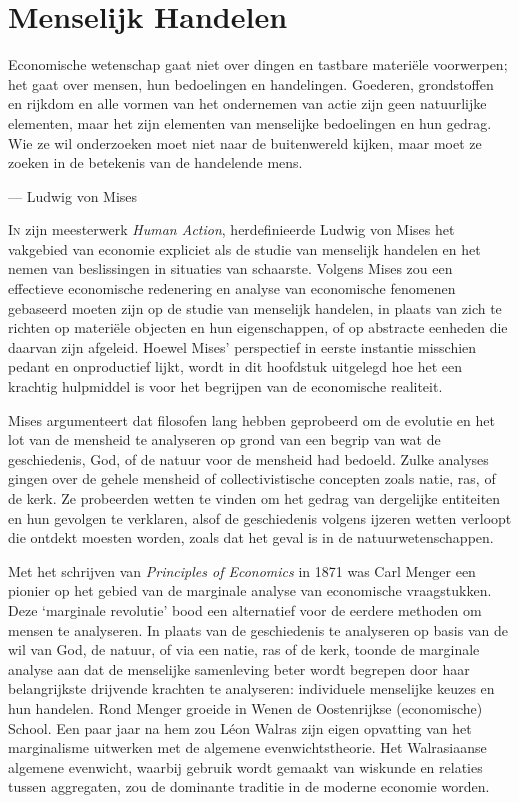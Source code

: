 \chapter{Menselijk Handelen}

\begin{blockquotebox}
    Economische wetenschap gaat niet over dingen en tastbare materiële voorwerpen; het gaat over mensen, hun bedoelingen en handelingen. Goederen, grondstoffen en rijkdom en alle vormen van het ondernemen van actie zijn geen natuurlijke elementen, maar het zijn elementen van menselijke bedoelingen en hun gedrag. Wie ze wil onderzoeken moet niet naar de buitenwereld kijken, maar moet ze zoeken in de betekenis van de handelende mens.\footnotemark \par\raggedleft--- Ludwig von Mises
\end{blockquotebox}

\noindent \lettrine{I}n zijn meesterwerk \textit{Human Action}, herdefinieerde Ludwig von Mises het vakgebied van economie expliciet als de studie van menselijk handelen en het nemen van beslissingen in situaties van schaarste. Volgens Mises zou een effectieve economische redenering en analyse van economische fenomenen gebaseerd moeten zijn op de studie van menselijk handelen, in plaats van zich te richten op materiële objecten en hun eigenschappen, of op abstracte eenheden die daarvan zijn afgeleid. Hoewel Mises' perspectief in eerste instantie misschien pedant en onproductief lijkt, wordt in dit hoofdstuk uitgelegd hoe het een krachtig hulpmiddel is voor het begrijpen van de economische realiteit.

Mises argumenteert dat filosofen lang hebben geprobeerd om de evolutie en het lot van de mensheid te analyseren op grond van een begrip van wat de geschiedenis, God, of de natuur voor de mensheid had bedoeld. Zulke analyses gingen over de gehele mensheid of collectivistische concepten zoals natie, ras, of de kerk. Ze probeerden wetten te vinden om het gedrag van dergelijke entiteiten en hun gevolgen te verklaren, alsof de geschiedenis volgens ijzeren wetten verloopt die ontdekt moesten worden, zoals dat het geval is in de natuurwetenschappen.

Met het schrijven van \textit{Principles of Economics} in 1871 was Carl Menger een pionier op het gebied van de marginale analyse van economische vraagstukken. Deze `marginale revolutie' bood een alternatief voor de eerdere methoden om mensen te analyseren. In plaats van de geschiedenis te analyseren op basis van de wil van God, de natuur, of via een natie, ras of de kerk, toonde de marginale analyse aan dat de menselijke samenleving beter wordt begrepen door haar belangrijkste drijvende krachten te analyseren: individuele menselijke keuzes en hun handelen. Rond Menger groeide in Wenen de Oostenrijkse (economische) School. Een paar jaar na hem zou Léon Walras zijn eigen opvatting van het marginalisme uitwerken met de algemene evenwichtstheorie. Het Walrasiaanse algemene evenwicht, waarbij gebruik wordt gemaakt van wiskunde en relaties tussen aggregaten, zou de dominante traditie in de moderne economie worden.

